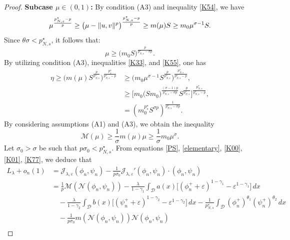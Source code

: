 \documentclass[10pt,a4paper]{amsart}
\numberwithin{equation}{section}
\begin{document}
\begin{proof}
\noindent\textbf{Subcase $\mu\in (0,1)$:} By condition (A3) and inequality
\eqref{K54}, we have
\[
\mu^\frac{p^\star_{N,s}-p}{p} \geq \big(\mu-\| u,v\|^p\big)^\frac{p^\star_{N,s}-p}{p}\\
\geq  m(\mu) S
\geq  m_0 \mu^{\sigma-1}S.
\]
Since $\theta \sigma<p_{N,s}^\star$, it follows that:
\begin{equation}\label{K55}
\mu\geq \big(m_0 S\big)^\frac{p}{p_{N,s}^\star-\sigma p}.
\end{equation}
By utilizing condition (A3), inequalities \eqref{K33}, and \eqref{K55}, one has
\begin{equation} \label{K66}
\begin{aligned}
\eta\geq \Big( m(\mu)S^\frac{p}{p^\star_{N,s}}
\Big)^{\frac{p^\star_s}{p^\star_{N,s}-p}}
&\geq \Big(m_0\mu^{\sigma-1}S^\frac{p}{p^\star_{N,s}} \Big)^{\frac{p^\star_{N,s}}{p^\star_{N,s}-p}}, \\
&\geq \Big[m_0\big(S m_0\big)^\frac{(\sigma-1)p}{p^\star_{N,s}-\sigma p}S^\frac{p}{p^\star_{N,s}} \Big]^{\frac{p^\star_{N,s}}{p^\star_{N,s}-p}},\\
&= (m_0^{p^\star_s}S^{\sigma p})^\frac{1}{p^\star_{N,s}-\sigma p}.
\end{aligned}
\end{equation}
By considering assumptions (A1) and (A3), we obtain the  inequality
\begin{equation}\label{K77}
\mathscr{M}(\mu)\geq \frac{1}{\sigma}m(\mu)\mu\geq \frac{1}{\sigma}m_0\mu^\sigma.
\end{equation}
Let $\sigma_0>\sigma$ be such that $p\sigma_0<p^\star_{N,s}$.
From equations \eqref{PS}, \eqref{elementary}, \eqref{K00}, \eqref{K01}, \eqref{K77},
we deduce that
\begin{equation} \label{eq01}
\begin{aligned}
L_\lambda+o_n(1)
&=\mathcal{J}_{\lambda,\varepsilon}(\phi_n,\psi_n)-\frac{1}{p\sigma_0}\mathcal{J}_{\lambda,\varepsilon}'(\phi_n,\psi_n)\cdot(\phi_n,\psi_n) \\
&=\frac{1}{p}\mathscr{M}(\mathcal{N}(\phi_n,\psi_n))-\frac{\lambda}{1-\gamma_1}\int_\mathcal{D} a(x)\Big[(\phi_n^++\varepsilon)^{1-\gamma_1}-\varepsilon^{1-\gamma_1}\Big]\,dx\\
&\quad-\frac{\lambda}{1-\gamma_2}\int_\mathcal{D} b(x)\Big[(\psi_n^++\varepsilon)^{1-\gamma_2}-\varepsilon^{1-\gamma_2}\Big]\,dx-\frac{1}{p^\star_{N,s}}\int_\mathcal{D}  (\phi_n^+)^{\theta_1}(\psi_n^+)^{\theta_2}\,dx \\
&\quad-\frac{1}{p\sigma_0}m(\mathcal{N}(\phi_n,\psi_n))\mathcal{N}(\phi_n,\psi_n) \\

\end{aligned}
\end{equation}
\end{proof}
\end{document}
